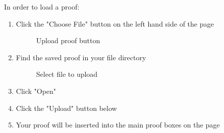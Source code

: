 In order to load a proof:
\begin{enumerate}
	\item Click the "Choose File" button on the left hand side of the page
	
	\begin{figure}[!ht]
		\centering
		\caption{Upload proof button}
	\end{figure}

	\item Find the saved proof in your file directory
	
	\begin{figure}[!ht]
		\centering
		\caption{Select file to upload}
	\end{figure}

	\item Click "Open"
	\item Click the "Upload" button below
	\item Your proof will be inserted into the main proof boxes on the page
\end{enumerate}


\pagebreak






